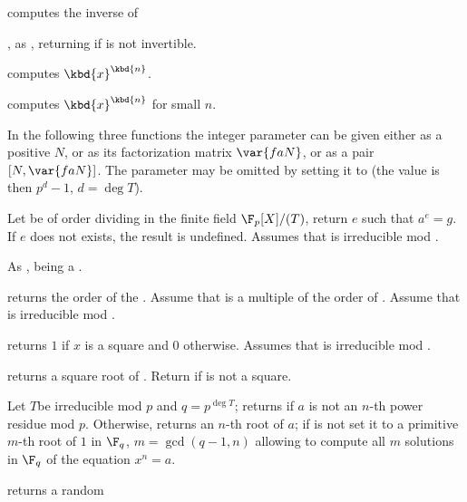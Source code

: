  computes the inverse of 

, as , returning
 if  is not invertible.

 computes $\kbd{x}^\kbd{n}$.

 computes $\kbd{x}^\kbd{n}$
for small $n$.

In the following three functions the integer parameter  can be given
either as a positive  $N$, or as its factorization matrix $\var{faN}$,
or as a pair $[N,\var{faN}]$. The parameter may be omitted by setting it to
 (the value is then $p^d-1$, $d = \deg T$).

 Let  be of
order dividing  in the finite field $\F_p[X]/(T)$, return $e$ such that
$a^e=g$. If $e$ does not exists, the result is undefined. Assumes
that  is irreducible mod .

 As
,  being a .

 returns the order of the
 . Assume that  is a multiple of the order of
. Assume that  is irreducible mod .

 returns $1$ if $x$ is a square
and $0$ otherwise. Assumes that  is irreducible mod .

 returns a square root of .
Return  if  is not a square.

Let $T$be irreducible mod $p$ and $q = p^{\deg T}$; returns  if $a$
is not an $n$-th power residue mod $p$. Otherwise, returns an $n$-th root of
$a$; if  is not  set it to a primitive $m$-th root of $1$
in $\F_q$, $m = \gcd(q-1,n)$ allowing to compute all $m$ solutions in $\F_q$
of the equation $x^n = a$.


 returns a random 



